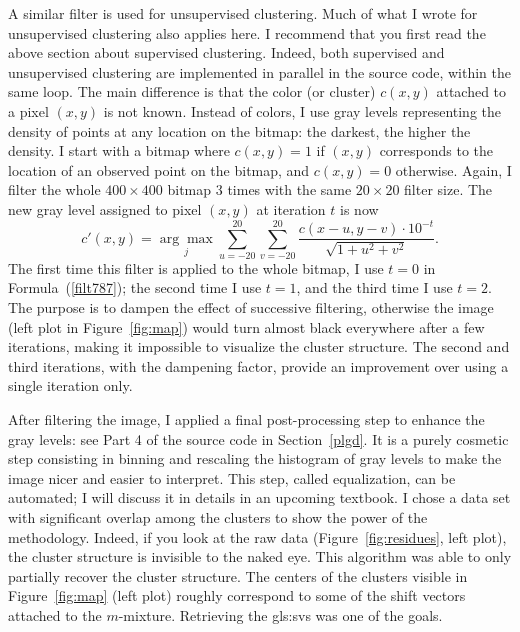\documentclass[10pt]{article}
\begin{document}
\noindent A similar filter is used for unsupervised clustering. Much of what I wrote for unsupervised clustering also applies here. I recommend that you first read the above section about supervised clustering. Indeed, both supervised and unsupervised clustering are implemented in parallel in the source code, within the same loop. The main difference is that the color (or cluster) $c(x,y)$ attached to a pixel $(x,y)$ is not known. Instead of colors, I use gray levels representing the density of points at any location on the bitmap: the darkest, the higher the density. I start with a bitmap where $c(x,y)=1$ if $(x,y)$ corresponds to the location of an observed point on the bitmap, and $c(x,y)=0$ otherwise. Again, I filter the whole $400\times 400$ bitmap 3 times with the same
$20\times 20$ filter size. The new gray level assigned to pixel $(x,y)$ at iteration $t$ is now
\begin{equation}
c'(x,y)=\underset{j}{\arg \max} \sum_{u=-20}^{20}\sum_{v=-20}^{20}\frac{c(x-u,y-v)\cdot 10^{-t}}{\sqrt{1+u^2+v^2}}. \label{filt787}
\end{equation}
The first time this filter is applied to the whole bitmap, I use $t=0$ in Formula~(\ref{filt787}); the second time I use $t=1$, and the third time I use $t=2$. The purpose is to dampen the effect of successive filtering, otherwise the image (left plot in Figure~\ref{fig:map}) would turn almost black everywhere after a few iterations, making it impossible to visualize the cluster structure. The second and third iterations, with the dampening factor, provide an improvement over using a single iteration only.

After filtering the image, I applied a final post-processing step to enhance the gray levels: see Part 4 of the source code in Section~\ref{plgd}. It is a purely cosmetic step consisting in binning and rescaling the histogram of gray levels to make the image nicer and easier to interpret. This step, called equalization,  can be automated; I will discuss it in details in an upcoming textbook. I chose
a data set with significant overlap among the clusters to show the power of the methodology. Indeed, if you look at the raw data (Figure~\ref{fig:residues}, left plot), the
cluster structure is invisible to the naked eye. This algorithm was able to only partially recover the cluster structure. The centers of the clusters visible in
Figure~\ref{fig:map} (left plot) roughly correspond to some of the
shift vectors attached to the $m$-mixture. Retrieving the
\glspl{gls:sv} was one of the goals.
\end{document}
